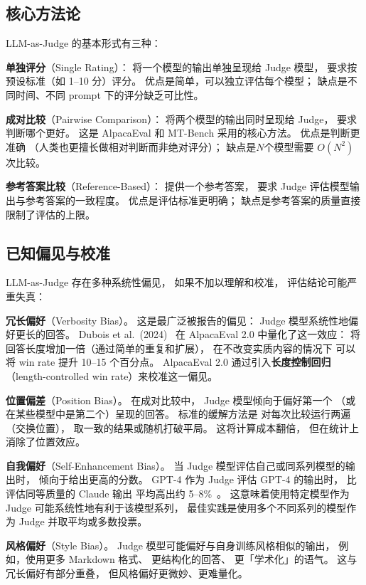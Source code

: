 \subsection{核心方法论}

LLM-as-Judge 的基本形式有三种：

\textbf{单独评分}（Single Rating）：
将一个模型的输出单独呈现给 Judge 模型，
要求按预设标准（如 1--10 分）评分。
优点是简单，可以独立评估每个模型；
缺点是不同时间、不同 prompt 下的评分缺乏可比性。

\textbf{成对比较}（Pairwise Comparison）：
将两个模型的输出同时呈现给 Judge，
要求判断哪个更好。
这是 AlpacaEval 和 MT-Bench 采用的核心方法。
优点是判断更准确
（人类也更擅长做相对判断而非绝对评分）；
缺点是$N$个模型需要 $O(N^2)$ 次比较。

\textbf{参考答案比较}（Reference-Based）：
提供一个参考答案，
要求 Judge 评估模型输出与参考答案的一致程度。
优点是评估标准更明确；
缺点是参考答案的质量直接限制了评估的上限。

\subsection{已知偏见与校准}

LLM-as-Judge 存在多种系统性偏见，
如果不加以理解和校准，
评估结论可能严重失真：

\textbf{冗长偏好}（Verbosity Bias）。
这是最广泛被报告的偏见：
Judge 模型系统性地偏好更长的回答。
Dubois et al.\ (2024)~\cite{dubois2024alpacaeval2}
在 AlpacaEval 2.0 中量化了这一效应：
将回答长度增加一倍（通过简单的重复和扩展），
在不改变实质内容的情况下
可以将 win rate 提升 10--15 个百分点。
AlpacaEval 2.0 通过引入\textbf{长度控制回归}
（length-controlled win rate）来校准这一偏见。

\textbf{位置偏差}（Position Bias）。
在成对比较中，
Judge 模型倾向于偏好第一个
（或在某些模型中是第二个）呈现的回答。
标准的缓解方法是
对每次比较运行两遍（交换位置），
取一致的结果或随机打破平局。
这将计算成本翻倍，
但在统计上消除了位置效应。

\textbf{自我偏好}（Self-Enhancement Bias）。
当 Judge 模型评估自己或同系列模型的输出时，
倾向于给出更高的分数。
GPT-4 作为 Judge 评估 GPT-4 的输出时，
比评估同等质量的 Claude 输出
平均高出约 5--8\%~\cite{wataoka2024selfbias}。
这意味着使用特定模型作为 Judge
可能系统性地有利于该模型系列，
最佳实践是使用多个不同系列的模型作为 Judge
并取平均或多数投票。

\textbf{风格偏好}（Style Bias）。
Judge 模型可能偏好与自身训练风格相似的输出，
例如，使用更多 Markdown 格式、
更结构化的回答、
更「学术化」的语气。
这与冗长偏好有部分重叠，
但风格偏好更微妙、更难量化。

